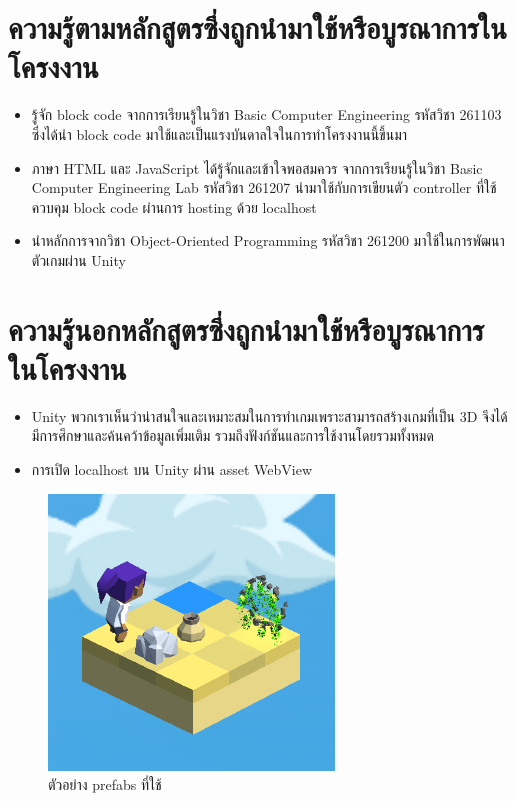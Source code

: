 \section{ความรู้ตามหลักสูตรซึ่งถูกนำมาใช้หรือบูรณาการในโครงงาน}
\begin{itemize}
  \item รู้จัก block code จากการเรียนรู้ในวิชา Basic Computer Engineering รหัสวิชา 261103 ซึ่งได้นำ block code มาใช้และเป็นแรงบันดาลใจในการทำโครงงานนี้ขึ้นมา
  \item ภาษา HTML และ JavaScript ได้รู้จักและเข้าใจพอสมควร จากการเรียนรู้ในวิชา Basic Computer Engineering Lab รหัสวิชา 261207 นำมาใช้กับการเขียนตัว controller ที่ใช้ควบคุม block code ผ่านการ hosting ด้วย localhost
  \item นำหลักการจากวิชา Object-Oriented Programming รหัสวิชา 261200 มาใช้ในการพัฒนาตัวเกมผ่าน Unity
\end{itemize}

\section{ความรู้นอกหลักสูตรซึ่งถูกนำมาใช้หรือบูรณาการในโครงงาน}
\begin{itemize}
  \item Unity พวกเราเห็นว่าน่าสนใจและเหมาะสมในการทำเกมเพราะสามารถสร้างเกมที่เป็น 3D จึงได้มีการศึกษาและค้นคว้าข้อมูลเพิ่มเติม รวมถึงฟังก์ชันและการใช้งานโดยรวมทั้งหมด
  \item การเปิด localhost บน Unity ผ่าน asset WebView
\end{itemize}

\begin{figure}[h!]
\begin{center}
\includegraphics{pic/prefabs.png}
\end{center}
\caption[ตัวอย่าง prefabs ที่ใช้]{ตัวอย่าง prefabs ที่ใช้ }
\label{prefabs}
\end{figure}
